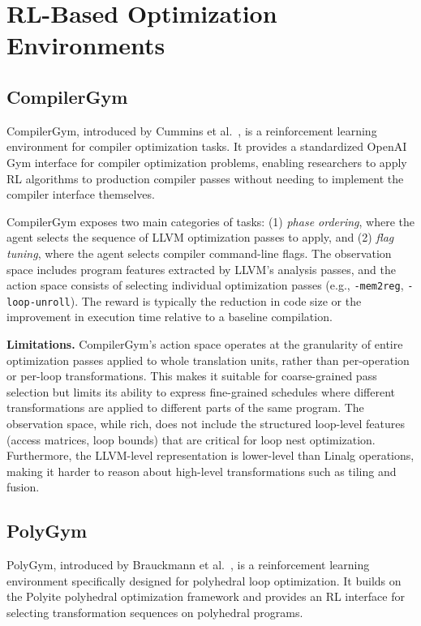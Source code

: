 \section{RL-Based Optimization Environments}

\subsection{CompilerGym}

CompilerGym, introduced by Cummins et al.~\cite{cummins2021compilergym}, is a reinforcement learning environment for compiler optimization tasks. It provides a standardized OpenAI Gym interface for compiler optimization problems, enabling researchers to apply RL algorithms to production compiler passes without needing to implement the compiler interface themselves.

CompilerGym exposes two main categories of tasks: (1) \textit{phase ordering}, where the agent selects the sequence of LLVM optimization passes to apply, and (2) \textit{flag tuning}, where the agent selects compiler command-line flags. The observation space includes program features extracted by LLVM's analysis passes, and the action space consists of selecting individual optimization passes (e.g., \texttt{-mem2reg}, \texttt{-loop-unroll}). The reward is typically the reduction in code size or the improvement in execution time relative to a baseline compilation.

\textbf{Limitations.} CompilerGym's action space operates at the granularity of entire optimization passes applied to whole translation units, rather than per-operation or per-loop transformations. This makes it suitable for coarse-grained pass selection but limits its ability to express fine-grained schedules where different transformations are applied to different parts of the same program. The observation space, while rich, does not include the structured loop-level features (access matrices, loop bounds) that are critical for loop nest optimization. Furthermore, the LLVM-level representation is lower-level than Linalg operations, making it harder to reason about high-level transformations such as tiling and fusion.

\subsection{PolyGym}

PolyGym, introduced by Brauckmann et al.~\cite{brauckmann2021polygym}, is a reinforcement learning environment specifically designed for polyhedral loop optimization. It builds on the Polyite polyhedral optimization framework and provides an RL interface for selecting transformation sequences on polyhedral programs.

